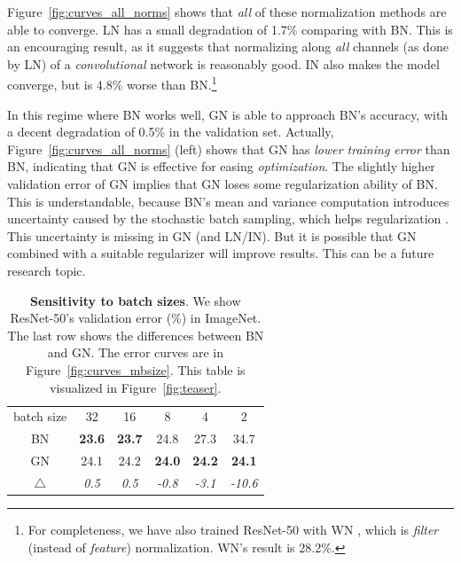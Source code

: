 \documentclass[10pt,twocolumn,letterpaper]{article}
\begin{document}
Figure~\ref{fig:curves_all_norms} shows that \emph{all} of these normalization methods are able to converge. LN has a small degradation of 1.7\% comparing with BN. This is an encouraging result, as it suggests that normalizing along \emph{all} channels (as done by LN) of a \emph{convolutional} network is reasonably good. IN also makes the model converge, but is 4.8\% worse than BN.\footnote{For completeness, we have also trained ResNet-50 with WN \cite{Salimans2016}, which is \emph{filter} (instead of \emph{feature}) normalization. WN's result is 28.2\%. }

In this regime where BN works well, GN is able to approach BN's accuracy, with a decent degradation of 0.5\% in the validation set. Actually, Figure~\ref{fig:curves_all_norms} (left) shows that GN has \emph{lower training error} than BN, indicating that GN is effective for easing \emph{optimization}. The slightly higher validation error of GN implies that GN loses some regularization ability of BN. This is understandable, because BN's mean and variance computation introduces uncertainty caused by the stochastic batch sampling, which helps regularization \cite{Ioffe2015}. This uncertainty is missing in GN (and LN/IN). But it is possible that GN combined with a suitable regularizer will improve results. This can be a future research topic.

\renewcommand\arraystretch{1.05}
\setlength{\tabcolsep}{8pt}
\begin{table}[t]
\centering
\small
\begin{tabular}{c|ccccc}
\hline
batch size & 32 & 16 & 8 & 4 & 2\\
\shline
BN & \textbf{23.6} & \textbf{23.7} & 24.8 & 27.3 & 34.7 \\
GN & 24.1 & 24.2 & \textbf{24.0} & \textbf{24.2} & \textbf{24.1} \\
$\triangle$ & \emph{0.5} & \emph{0.5} & \emph{-0.8} & \emph{-3.1} & \emph{-10.6} \\
\hline
\end{tabular}
\vspace{1em}
\caption{\textbf{Sensitivity to batch sizes}. We show ResNet-50's validation error (\%) in ImageNet. The last row shows the differences between BN and GN.
The error curves are in Figure~\ref{fig:curves_mbsize}. This table is visualized in Figure~\ref{fig:teaser}.}\label{tab:mbsize}
\vspace{-1em}
\end{table}
\end{document}
